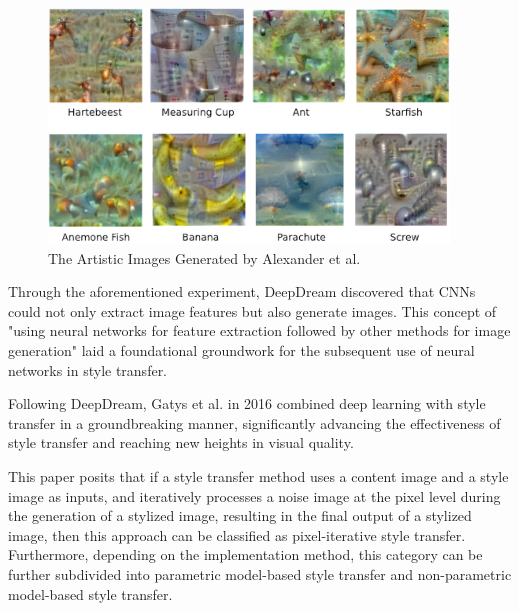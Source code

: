 \documentclass[preprint,12pt]{elsarticle}
\begin{document}
\begin{figure}[htbp]%
    \centering%
    \includegraphics[width=0.95\textwidth]{Figure_2_The_Artistic_Images_Generated_by_Alexander_et_al.jpg}
    \caption{The Artistic Images Generated by Alexander et al.\citep{24mordvintsev2015inceptionism}}\label{fig2}
\end{figure}


Through the aforementioned experiment, DeepDream discovered that CNNs could not only extract image features but also generate images. This concept of "using neural networks for feature extraction followed by other methods for image generation" laid a foundational groundwork for the subsequent use of neural networks in style transfer.

Following DeepDream, Gatys et al. \citep{02gatys2016image} in 2016 combined deep learning with style transfer in a groundbreaking manner, significantly advancing the effectiveness of style transfer and reaching new heights in visual quality.

This paper posits that if a style transfer method uses a content image and a style image as inputs, and iteratively processes a noise image at the pixel level during the generation of a stylized image, resulting in the final output of a stylized image, then this approach can be classified as pixel-iterative style transfer. Furthermore, depending on the implementation method, this category can be further subdivided into parametric model-based style transfer and non-parametric model-based style transfer.
\end{document}
